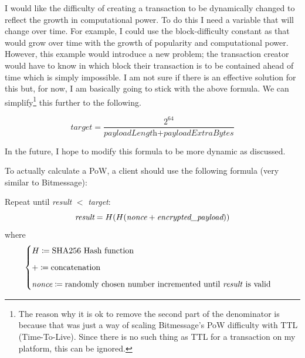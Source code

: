 \documentclass{article}
\begin{document}
I would like the difficulty of creating a transaction to be dynamically changed to reflect the growth in computational power. To do this I need a variable that will change over time. For example, I could use the block-difficulty constant as that would grow over time with the growth of popularity and computational power. However, this example would introduce a new problem; the transaction creator would have to know in which block their transaction is to be contained ahead of time which is simply impossible. I am not sure if there is an effective solution for this but, for now, I am basically going to stick with the above formula. We can simplify\footnote{The reason why it is ok to remove the second part of the denominator is because that was just a way of scaling Bitmessage's PoW difficulty with TTL (Time-To-Live). Since there is no such thing as TTL for a transaction on my platform, this can be ignored.} this further to the following.
\vspace{-0.5cm}
\begin{center}
\[\textit{target} = \dfrac{2^{64}}{\textit{payloadLength} + \textit{payloadExtraBytes}}\]
\end{center}

In the future, I hope to modify this formula to be more dynamic as discussed.

To actually calculate a PoW, a client should use the following formula (very similar to Bitmessage):


Repeat until \textit{result} $<$ \textit{target}:
\[
    \textit{result} = H(H(\textit{nonce} + \textit{encrypted\_payload})) \\
\]
where
\[
    \begin{cases}
        H \coloneqq \textrm{SHA256 Hash function} \\[6pt]
        + \coloneqq \textrm{concatenation} \\[6pt]
        \textit{nonce} \coloneqq \textrm{randomly chosen number incremented until \textit{result} is valid}
    \end{cases}
\]
\end{document}
